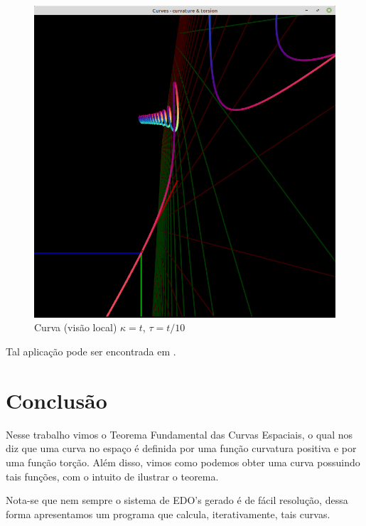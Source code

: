 \documentclass{article}
\begin{document}
\begin{figure}[H]
    \centering
    \includegraphics[scale = 0.5]{img/local.png}
    \caption{Curva (visão local) $\kappa = t$, $\tau = t/10$}
\end{figure}

Tal aplicação pode ser encontrada em \cite{github}.

\section{Conclusão}

Nesse trabalho vimos o Teorema Fundamental das Curvas Espaciais, o qual nos diz que uma curva no espaço é definida por uma função curvatura positiva e por uma função torção. Além disso, vimos como podemos obter uma curva possuindo tais funções, com o intuito de ilustrar o teorema. 

Nota-se que nem sempre o sistema de EDO's gerado é de fácil resolução, dessa forma apresentamos um programa que calcula, iterativamente, tais curvas.
\end{document}
